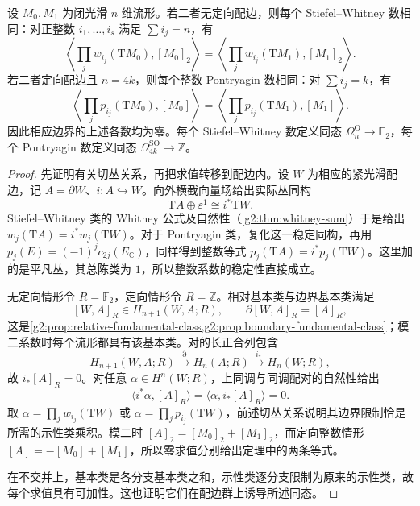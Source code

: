 \begin{theorem}\label{g2:thm:characteristic-number-bordism}
	设 \(M_0,M_1\) 为闭光滑 \(n\) 维流形。若二者无定向配边，则每个 Stiefel--Whitney 数相同：对正整数 \(i_1,\ldots,i_s\) 满足 \(\sum i_j=n\)，有
	\[
		\left\langle\prod_jw_{i_j}(\mathrm TM_0),[M_0]_2\right\rangle
		=\left\langle\prod_jw_{i_j}(\mathrm TM_1),[M_1]_2\right\rangle.
	\]
	若二者定向配边且 \(n=4k\)，则每个整数 Pontryagin 数相同：对 \(\sum i_j=k\)，有
	\[
		\left\langle\prod_jp_{i_j}(\mathrm TM_0),[M_0]\right\rangle
		=\left\langle\prod_jp_{i_j}(\mathrm TM_1),[M_1]\right\rangle.
	\]
	因此相应边界的上述各数均为零。每个 Stiefel--Whitney 数定义同态 \(\Omega_n^{\mathrm O}\to\mathbb F_2\)，每个 Pontryagin 数定义同态 \(\Omega_{4k}^{\mathrm{SO}}\to\mathbb Z\)。
\end{theorem}
\begin{proof}
	先证明有关切丛关系，再把求值转移到配边内。设 \(W\) 为相应的紧光滑配边，记 \(A=\partial W\)、\(i:A\hookrightarrow W\)。向外横截向量场给出实际丛同构
	\[
		\mathrm TA\oplus\varepsilon^1\cong i^*\mathrm TW.
	\]
	Stiefel--Whitney 类的 Whitney 公式及自然性（\cref{g2:thm:whitney-sum}）于是给出 \(w_j(\mathrm TA)=i^*w_j(\mathrm TW)\)。对于 Pontryagin 类，复化这一稳定同构，再用 \(p_j(E)=(-1)^jc_{2j}(E_{\mathbb C})\)，同样得到整数等式 \(p_j(\mathrm TA)=i^*p_j(\mathrm TW)\)。这里加的是平凡丛，其总陈类为 \(1\)，所以整数系数的稳定性直接成立。

	无定向情形令 \(R=\mathbb F_2\)，定向情形令 \(R=\mathbb Z\)。相对基本类与边界基本类满足
	\[
		[W,A]_R\in H_{n+1}(W,A;R),\qquad
		\partial[W,A]_R=[A]_R,
	\]
	这是\cref{g2:prop:relative-fundamental-class,g2:prop:boundary-fundamental-class}；模二系数时每个流形都具有该基本类。对的长正合列包含
	\[
		H_{n+1}(W,A;R)\xrightarrow{\partial}H_n(A;R)\xrightarrow{i_*}H_n(W;R),
	\]
	故 \(i_*[A]_R=0\)。对任意 \(\alpha\in H^n(W;R)\)，上同调与同调配对的自然性给出
	\begin{equation}\label{g2:eq:extendible-class-boundary-zero}
		\langle i^*\alpha,[A]_R\rangle=\langle\alpha,i_*[A]_R\rangle=0.
	\end{equation}
	取 \(\alpha=\prod_jw_{i_j}(\mathrm TW)\) 或 \(\alpha=\prod_jp_{i_j}(\mathrm TW)\)，前述切丛关系说明其边界限制恰是所需的示性类乘积。模二时 \([A]_2=[M_0]_2+[M_1]_2\)，而定向整数情形 \([A]=-[M_0]+[M_1]\)，所以零求值分别给出定理中的两条等式。

	在不交并上，基本类是各分支基本类之和，示性类逐分支限制为原来的示性类，故每个求值具有可加性。这也证明它们在配边群上诱导所述同态。
\end{proof}

